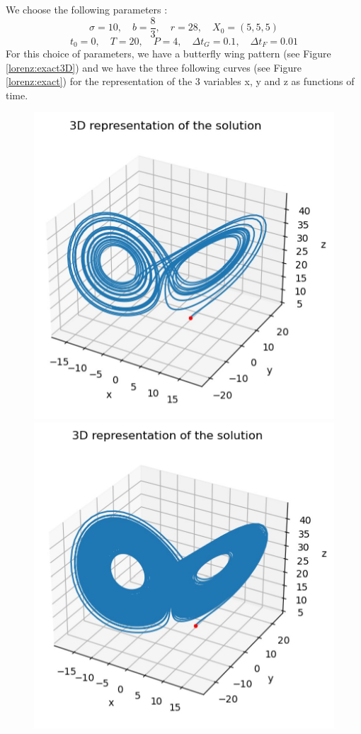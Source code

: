 \begin{enumerate}[label=\textbullet]
	We choose the following parameters :
	$$\sigma=10, \quad b=\frac{8}{3}, \quad r=28, \quad X_0=(5,5,5)$$
	$$t_0=0, \quad T=20, \quad P=4,\quad \Delta t_G=0.1, \quad \Delta t_F=0.01$$
	For this choice of parameters, we have a butterfly wing pattern (see Figure \ref{lorenz:exact3D}) and we have the three following curves (see Figure \ref{lorenz:exact}) for the representation of the 3 variables x, y and z as functions of time.
	\begin{figure}[H]       
		\begin{minipage}[t]{0.48\linewidth}
			\centering
			\includegraphics[width=0.9\linewidth]{"images/parareal/cpp/lorenz_exact_3D.jpg"}
		\end{minipage} \hfill
		\begin{minipage}[t]{0.48\linewidth}
			\centering
			\includegraphics[width=0.9\linewidth]{"images/parareal/cpp/lorenz_exact_3D_T200.jpg"}

\end{minipage}
\end{figure}
\end{enumerate}
